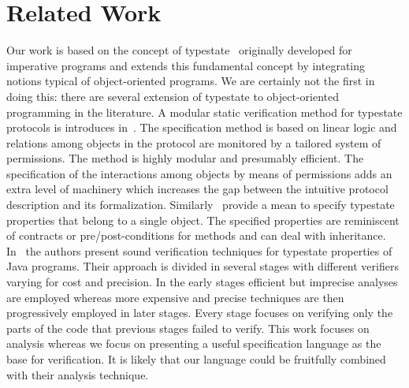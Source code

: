 \documentclass[preprint]{sigplanconf} %
\theoremstyle{definition}
\theoremstyle{remark}
\begin{document}
\section{Related Work}\label{sec:related} %
Our work is based on the concept of typestate~\cite{strom1986} originally developed for imperative programs and extends this fundamental concept by integrating notions typical of object-oriented programs. 
We are certainly not the first in doing this: there are several extension of typestate to object-oriented programming in the literature.
A modular static verification method for typestate protocols is introduces in~\cite{dblp:conf/oopsla/bierhoffa07}. 
The specification method is based on linear logic and relations among objects in the protocol are monitored by a tailored system of permissions. 
The method is highly modular and presumably efficient. The specification of the interactions among objects by means of permissions adds an extra level of machinery which increases the gap between the intuitive protocol description and its formalization. Similarly~\cite{deline2004,dblp:conf/sigsoft/BierhoffA05} provide a mean to specify typestate properties that belong to a single object. The specified properties are reminiscent of contracts or pre/post-conditions for methods and
can deal with inheritance.
In~\cite{dblp:conf/issta/FinkYDRG06} the authors present sound verification techniques for typestate properties of Java  programs.
Their approach is divided in several stages with different verifiers varying for cost and precision.
In the early stages efficient but imprecise analyses are employed whereas
more expensive and precise techniques are then progressively employed in later stages.
Every stage focuses on verifying only the parts of the code that previous stages failed to verify.
This work focuses on analysis whereas we focus on presenting a useful specification language as the base for verification.
It is likely that our language could be fruitfully combined with their analysis technique.
\end{document}
